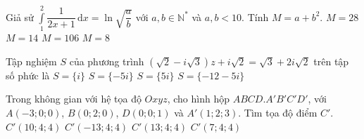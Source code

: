 \begin{ex}%
Giả sử $\displaystyle\int\limits_{1}^{2} \dfrac{1}{2x+1} \mathrm{\,d}x=\ln\sqrt{\dfrac{a}{b}}$ với $a,b \in \mathbb{N^*}$ và $a,b<10.$ Tính $M=a+b^2$.
\choice
{$M=28$}
{\True $M=14$}
{$M=106$}
{$M=8$}

\end{ex}


\begin{ex}%
Tập nghiệm $S$ của phương trình $(\sqrt{2}-i\sqrt{3})z+i\sqrt{2}=\sqrt{3}+2i\sqrt{2}$ trên tập số phức là
\choice
{\True $S=\{i\}$}
{$S=\{-5i\}$}
{$S=\{5i\}$}
{$S=\{-12-5i\}$}

\end{ex}


\begin{ex}%
Trong không gian với hệ tọa độ $Oxyz$, cho hình hộp $ABCD.A'B'C'D'$, với $A(-3;0;0)$, $B(0;2;0)$,  $D(0;0;1)$ và $A'(1;2;3)$. Tìm tọa độ điểm $C'$.
\choice
{$C'(10;4;4)$}
{$C'(-13;4;4)$}
{$C'(13;4;4)$}
{\True $C'(7;4;4)$}

\end{ex}


